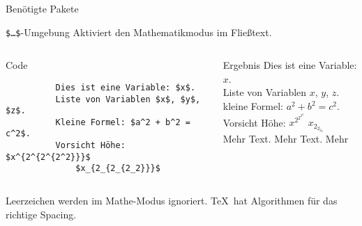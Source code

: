 \begin{frame}[fragile]{
  Benötigte Pakete
  \hfill{}
}
\end{frame}

\begin{frame}[fragile]{\texttt{\$…\$}-Umgebung}
  Aktiviert den Mathematikmodus im Fließtext.

  \begin{columns}[onlytextwidth, t]
    \begin{column}{0.56\textwidth}
      \begin{block}{Code}
        \begin{lstlisting}
          Dies ist eine Variable: $x$.
          Liste von Variablen $x$, $y$, $z$.
          Kleine Formel: $a^2 + b^2 = c^2$.
          Vorsicht Höhe: $x^{2^{2^{2^2}}}$
              $x_{2_{2_{2_2}}}$
        \end{lstlisting}
      \end{block}
    \end{column}
    \begin{column}{0.40\textwidth}
      \begin{block}{Ergebnis}
        Dies ist eine Variable: $x$. \\
        Liste von Variablen $x$, $y$, $z$. \\
        kleine Formel: $a^2 + b^2 = c^2$. \\
        Vorsicht Höhe: $x^{2^{2^{2^2}}}$ $x_{2_{2_{2_2}}}$ \\
        Mehr Text. Mehr Text. Mehr
      \end{block}
    \end{column}
  \end{columns}

  \vspace{1em}
  Leerzeichen werden im Mathe-Modus ignoriert.
  \TeX\ hat Algorithmen für das richtige Spacing.
\end{frame}

